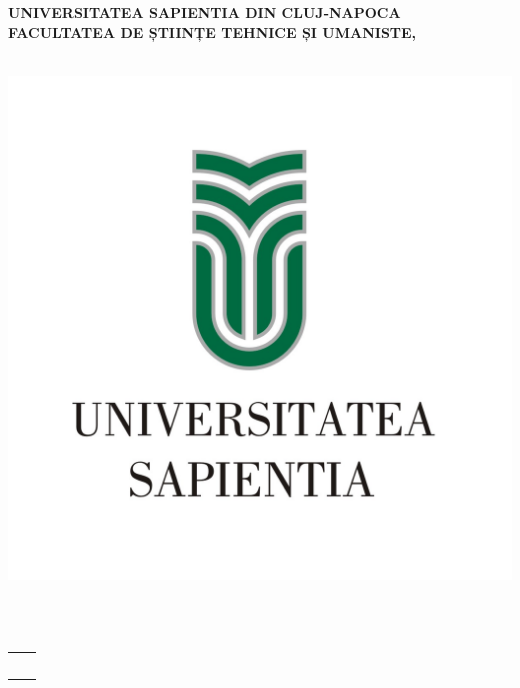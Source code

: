 
\begin{titlepage}
	\begin{center}
	
		\large{\bfseries UNIVERSITATEA SAPIENTIA DIN CLUJ-NAPOCA} \\
		\large{\bfseries FACULTATEA DE ȘTIINȚE TEHNICE ȘI UMANISTE,} \\
		
		\large{\bfseries \szakRO} \\[2.5cm]
			\begin{center}
			\includegraphics[scale=2]{images/sapientia-ro}
		\end{center}
		\vspace{0.4cm}
		\Large{\Large \cimRO}\\[0.8cm]
		\vspace{0.2cm}
		\textsc{\Large \bfseries \dolgozattipusRO}\\[2.5cm]
		
		{
			\large
			\renewcommand{\arraystretch}{0.85}
			\begin{tabular}{cc}
				 \makebox[6.5cm]{Coordonator științific:} & \makebox[6.5cm]{Absolvent:} \\ \noalign{\smallskip}
				 \makebox[6.5cm]{\temavezetoA,} & \makebox[6.5cm]{\szerzo} \\ {\temavezetoAfokozatRo} \\
				 \makebox[6.5cm]{\temavezetoB,} & \\ {\temavezetoBfokozatRo} \\
			\end{tabular}
		}
		
		\vfill
		{\large \bfseries \ev}
	\end{center}
\end{titlepage}